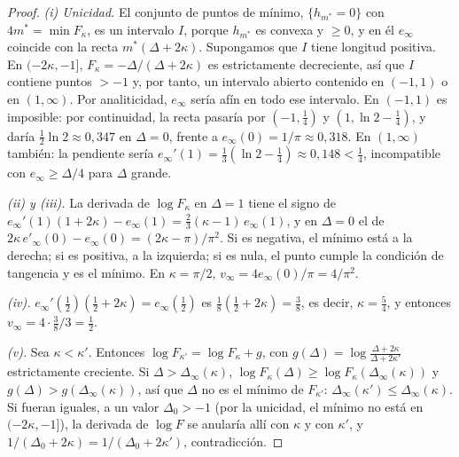 \documentclass[11pt,a4paper]{article}
\theoremstyle{remark}
\begin{document}
\begin{proof}
\emph{(i) Unicidad.} El conjunto de puntos de mínimo, $\{h_{m^\ast}=0\}$ con $4m^\ast=\min F_\kappa$,
es un intervalo $I$, porque $h_{m^\ast}$ es convexa y $\ge0$, y en él $e_\infty$ coincide con la
recta $m^\ast(\Delta+2\kappa)$. Supongamos que $I$ tiene longitud positiva. En
$(-2\kappa,-1]$, $F_\kappa=-\Delta/(\Delta+2\kappa)$ es estrictamente decreciente, así que $I$
contiene puntos $>-1$ y, por tanto, un intervalo abierto contenido en $(-1,1)$ o en $(1,\infty)$.
Por analiticidad, $e_\infty$ sería afín en todo ese intervalo. En $(-1,1)$ es imposible: por
continuidad, la recta pasaría por $(-1,\tfrac14)$ y $(1,\ln2-\tfrac14)$, y daría $\tfrac12\ln2\approx0{,}347$
en $\Delta=0$, frente a $e_\infty(0)=1/\pi\approx0{,}318$. En $(1,\infty)$ también: la pendiente
sería $e_\infty'(1)=\tfrac13(\ln2-\tfrac14)\approx0{,}148<\tfrac14$, incompatible con
$e_\infty\ge\Delta/4$ para $\Delta$ grande.

\emph{(ii) y (iii).} La derivada de $\log F_\kappa$ en $\Delta=1$ tiene el signo de
$e_\infty'(1)(1+2\kappa)-e_\infty(1)=\tfrac23(\kappa-1)\,e_\infty(1)$, y en $\Delta=0$ el de
$2\kappa\,e'_\infty(0)-e_\infty(0)=(2\kappa-\pi)/\pi^2$. Si es negativa, el mínimo está a la
derecha; si es positiva, a la izquierda; si es nula, el punto cumple la condición de tangencia y es
el mínimo. En $\kappa=\pi/2$, $v_\infty=4e_\infty(0)/\pi=4/\pi^2$.

\emph{(iv).} $e_\infty'(\tfrac12)(\tfrac12+2\kappa)=e_\infty(\tfrac12)$ es
$\tfrac18(\tfrac12+2\kappa)=\tfrac38$, es decir, $\kappa=\tfrac54$, y entonces
$v_\infty=4\cdot\tfrac38/3=\tfrac12$.

\emph{(v).} Sea $\kappa<\kappa'$. Entonces $\log F_{\kappa'}=\log F_\kappa+g$, con
$g(\Delta)=\log\frac{\Delta+2\kappa}{\Delta+2\kappa'}$ estrictamente creciente. Si
$\Delta>\Delta_\infty(\kappa)$, $\log F_\kappa(\Delta)\ge\log F_\kappa(\Delta_\infty(\kappa))$ y
$g(\Delta)>g(\Delta_\infty(\kappa))$, así que $\Delta$ no es el mínimo de $F_{\kappa'}$:
$\Delta_\infty(\kappa')\le\Delta_\infty(\kappa)$. Si fueran iguales, a un valor $\Delta_0>-1$ (por
la unicidad, el mínimo no está en $(-2\kappa,-1]$), la derivada de $\log F$ se anularía allí con
$\kappa$ y con $\kappa'$, y $1/(\Delta_0+2\kappa)=1/(\Delta_0+2\kappa')$, contradicción.


\end{proof}
\end{document}

